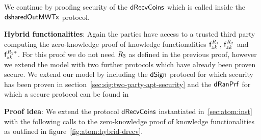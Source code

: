 We continue by proofing security of the $\mathsf{dRecvCoins}$ which is called inside the $\mathsf{dsharedOutMWTx}$ protocol.

\textbf{Hybrid functionalities}: Again the parties have access to a trusted third party computing the zero-knowledge proof of knowledge functionalities $\mathsf{f}^{\mathit{R}_1}_{zk}$, $\mathsf{f}^{\mathit{R}_2}_{zk}$ and $\mathsf{f}^{\mathit{R}_2*}_{zk}$.
For this proof we do not need $\mathit{R}_3$ as defined in the previous proof, however we extend the model with two further protocols which have already been proven secure.
We extend our model by including the $\mathsf{dSign}$ protocol for which security has been proven in section~\ref{sec:sig:two-party-apt-security} and the $\mathsf{dRanPrf}$ for which a secure protocol can be found in~\cite{klinec2020privacy}

\textbf{Proof idea}: We extend the protocol $\mathsf{dRecvCoins}$ instantiated in~\ref{sec:atom:inst} with the following calls to the zero-knowledge proof of knowledge functionalities as outlined in figure~\ref{fig:atom:hybrid-drecv}.

